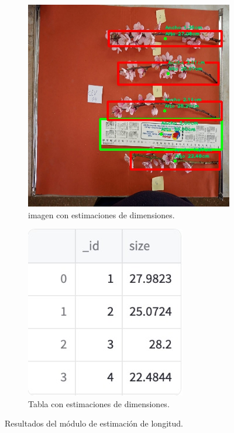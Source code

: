 \begin{figure}[ht]
     \centering
     \begin{subfigure}[b]{0.3\textwidth}
         \centering
         \includegraphics[scale=0.4]{./Figures/vareta_size.jpeg}
         \caption{imagen con estimaciones de dimensiones.}
         \label{fig:1de33}
     \end{subfigure}
     \hfill
     \begin{subfigure}[b]{0.3\textwidth}
         \centering
         \includegraphics[scale=.4]{./Figures/vareta_size_table.jpg}
         \caption{Tabla con estimaciones de dimensiones.}
         \label{fig:2de33}
     \end{subfigure}
        \caption{Resultados del módulo de estimación de longitud.}
        \label{fig:modulo1}
\end{figure}

